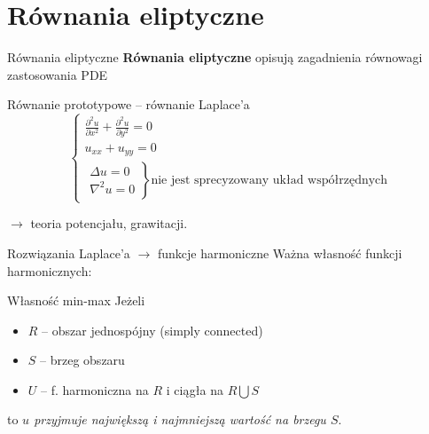 \section{Równania eliptyczne}

\begin{frame}{Równania eliptyczne}
  \textbf{Równania eliptyczne} opisują zagadnienia równowagi zastosowania PDE

  \begin{block}{Równanie prototypowe -- równanie Laplace'a}
    $$\left\{ \begin{array}{l}
    \frac{{\partial}^2u}{{\partial}x^2} + \frac{{\partial}^2u}{{\partial}y^2} = 0 \\
    u_{xx} + u_{yy} = 0 \\
    \left. \begin{array}{l}
    \Delta u = 0 \\
    {\nabla}^2 u = 0
    \end{array} \right\} \text{nie jest sprecyzowany układ współrzędnych}
    \end{array} \right.$$
  \end{block}
  $\rightarrow$ teoria potencjału, grawitacji.
\end{frame}

\begin{frame}
  Rozwiązania Laplace'a $\rightarrow$ funkcje harmoniczne\newline
  Ważna własność funkcji harmonicznych:
  \begin{block}{Własność min-max}
    Jeżeli
    \begin{itemize}
      \item $R$ -- obszar jednospójny (simply connected)
      \item $S$ -- brzeg obszaru
      \item $U$ -- f. harmoniczna na $R$ i ciągła na $R \bigcup S$ %
    \end{itemize}

    to \textit{$u$ przyjmuje największą i najmniejszą wartość na brzegu $S$}.
  \end{block}
\end{frame}

